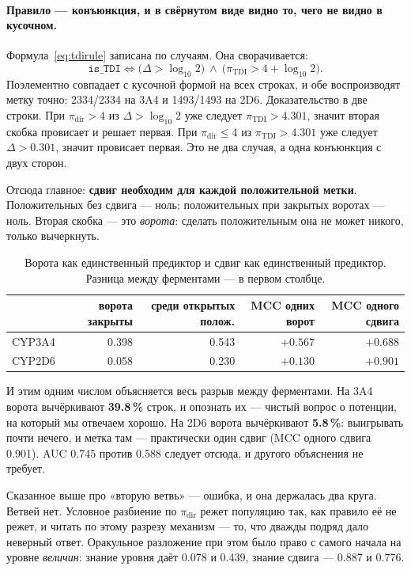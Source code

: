 \paragraph{Правило --- конъюнкция, и в свёрнутом виде видно то, чего не видно в кусочном.}
Формула~\eqref{eq:tdirule} записана по случаям. Она сворачивается:
\begin{equation}
\texttt{is\_TDI} \iff \bigl(\Delta > \log_{10} 2\bigr)\ \wedge\ \bigl(\pi_{\text{TDI}} > 4 + \log_{10} 2\bigr).
\label{eq:tdiconj}
\end{equation}
Поэлементно совпадает с кусочной формой на всех строках, и обе воспроизводят метку точно:
2334/2334 на 3A4 и 1493/1493 на 2D6. Доказательство в две строки. При $\pi_{\text{dir}} > 4$ из
$\Delta > \log_{10}2$ уже следует $\pi_{\text{TDI}} > 4.301$, значит вторая скобка провисает и
решает первая. При $\pi_{\text{dir}} \le 4$ из $\pi_{\text{TDI}} > 4.301$ уже следует
$\Delta > 0.301$, значит провисает первая. Это не два случая, а одна конъюнкция с двух сторон.

Отсюда главное: \textbf{сдвиг необходим для каждой положительной метки}. Положительных без
сдвига --- ноль; положительных при закрытых воротах --- ноль. Вторая скобка --- это \emph{ворота}:
сделать положительным она не может никого, только вычеркнуть.

\begin{table}[htbp]\centering\small
\begin{tabularx}{0.88\textwidth}{@{}Xrrrr@{}}
\toprule
 & ворота закрыты & среди открытых полож. & MCC одних ворот & MCC одного сдвига \\
\midrule
CYP3A4 & 0.398 & 0.543 & $+0.567$ & $+0.688$ \\
CYP2D6 & 0.058 & 0.230 & $+0.130$ & $+0.901$ \\
\bottomrule
\end{tabularx}
\caption{Ворота как единственный предиктор и сдвиг как единственный предиктор. Разница между
ферментами --- в первом столбце.}
\label{tab:tdigate}
\end{table}

И этим одним числом объясняется весь разрыв между ферментами. На 3A4 ворота вычёркивают
\textbf{39.8\,\%} строк, и опознать их --- чистый вопрос о потенции, на который мы отвечаем
хорошо. На 2D6 ворота вычёркивают \textbf{5.8\,\%}: выигрывать почти нечего, и метка там ---
практически один сдвиг (MCC одного сдвига 0.901). AUC 0.745 против 0.588 следует отсюда, и
другого объяснения не требует.

Сказанное выше про «вторую ветвь» --- ошибка, и она держалась два круга. Ветвей нет. Условное
разбиение по $\pi_{\text{dir}}$ режет популяцию так, как правило её не режет, и читать по этому
разрезу механизм --- то, что дважды подряд дало неверный ответ. Оракульное разложение при этом
было право с самого начала на уровне \emph{величин}: знание уровня даёт 0.078 и 0.439, знание
сдвига --- 0.887 и 0.776.

